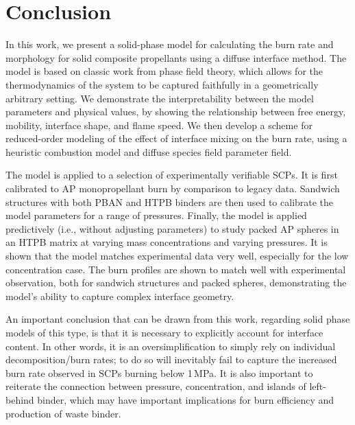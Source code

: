 \documentclass[colorinlistoftodos,review]{elsarticle}
\begin{document}
\section{Conclusion}\label{Conclusion} 

In this work, we present a solid-phase model for calculating the burn rate and morphology for solid composite propellants using a diffuse interface method.
The model is based on classic work from phase field theory, which allows for the thermodynamics of the system to be captured faithfully in a geometrically arbitrary setting.
We demonstrate the interpretability between the model parameters and physical values, by showing the relationship between free energy, mobility, interface shape, and flame speed.
We then develop a scheme for reduced-order modeling of the effect of interface mixing on the burn rate, using a heuristic combustion model and diffuse species field parameter field.

The model is applied to a selection of experimentally verifiable SCPs.
It is first calibrated to AP monopropellant burn by comparison to legacy data.
Sandwich structures with both PBAN and HTPB binders are then used to calibrate the model parameters for a range of pressures.
Finally, the model is applied predictively (i.e., without adjusting parameters) to study packed AP spheres in an HTPB matrix at varying mass concentrations and varying pressures.
It is shown that the model matches experimental data very well, especially for the low concentration case.
The burn profiles are shown to match well with experimental observation, both for sandwich structures and packed spheres, demonstrating the model's ability to capture complex interface geometry.

An important conclusion that can be drawn from this work, regarding solid phase models of this type, is that it is necessary to explicitly account for interface content.
In other words, it is an oversimplification to simply rely on individual decomposition\slash burn rates; to do so will inevitably fail to capture the increased burn rate observed in SCPs burning below 1\,MPa.
It is also important to reiterate the connection between pressure, concentration, and islands of left-behind binder, which may have important implications for burn efficiency and production of waste binder.
\end{document}
